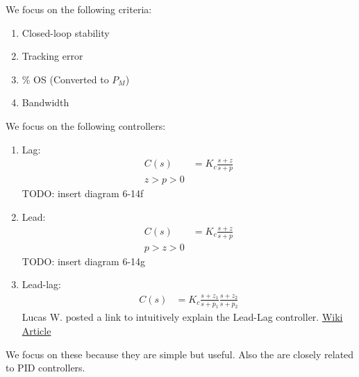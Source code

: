 \begin{enumerate}
\begin{enumerate}
\begin{itemize}
                        We focus on the following criteria:
                        \begin{enumerate}
                            \item Closed-loop stability
                            \item Tracking error
                            \item \% OS (Converted to $P_M$)
                            \item Bandwidth
                        \end{enumerate}

                        We focus on the following controllers:
                        \begin{enumerate}
                            \item Lag:
                                \begin{align*}
                                    C(s) &= K_c \frac{s+z}{s+p} \\
                                    z > p > 0
                                \end{align*}
                                TODO: insert diagram 6-14f
                            \item Lead:
                                \begin{align*}
                                    C(s) &= K_c \frac{s+z}{s+p} \\
                                    p > z > 0
                                \end{align*}
                                TODO: insert diagram 6-14g
                            \item Lead-lag:
                                \begin{align*}
                                    C(s) &= K_c \frac{s+z_1}{s+p_1}\frac{s+z_2}{s+p_2}
                                \end{align*}
                                Lucas W. posted a link to intuitively explain the Lead-Lag controller.
                                \href{http://en.wikipedia.org/wiki/Lead%E2%80%93lag_compensator#Intuitive_explanation}{Wiki Article}
                        \end{enumerate}
                        We focus on these because they are simple but useful. Also the are closely related to PID controllers.


\end{itemize}
\end{enumerate}
\end{enumerate}
